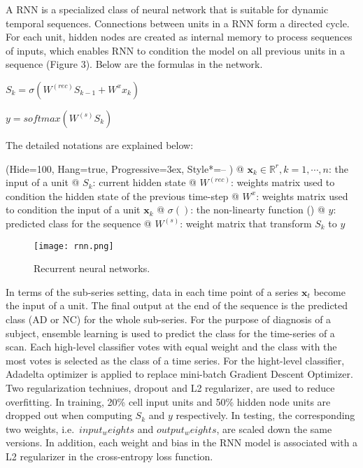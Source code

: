 A RNN is a specialized class of neural network that is suitable for dynamic temporal sequences. Connections between units in a RNN form a directed cycle. For each unit, hidden nodes are created as internal memory to process sequences of inputs, which enables RNN to condition the model on all previous units in a sequence (Figure 3). Below are the formulas in the network.

\begin{center}
$S_k = \sigma(W^{(rec)}S_{k-1} + W^{x}x_k )$
\end{center} 
\begin{center}
$y = softmax(W^{(s)}S_k)$
\end{center}

The detailed notations are explained below:
\begin{easylist}
\ListProperties(Hide=100, Hang=true, Progressive=3ex, Style*=-- )
@ $ \textbf{x}_k \in  \mathbb{R}^{r}, k=1, \cdots , n$: the input of a unit
@ $S_k $: current hidden state
@ $W^{(rec)}$: weights matrix used to condition the hidden state of the previous time-step 
@ $W^{x}$: weights matrix used to condition the input of a unit $ \textbf{x}_k$
@ $\sigma()$: the non-linearty function ()
@ $y$: predicted class for the sequence
@ $W^{(s)}$: weight matrix that transform $S_k$ to $y$
\end{easylist}

\begin{figure}
    \centering
    \texttt{[image: rnn.png]}
    \caption{Recurrent neural networks.}
    \label{fig:awesome_image}
\end{figure}

In terms of the sub-series setting, data in each time point of a series $\textbf{x}_t$ become the input of a unit. The final output at the end of the sequence is the predicted class (AD or NC) for the whole sub-series. For the purpose of diagnosis of a subject, ensemble learning is used to predict the class for the time-series of a scan. Each high-level classifier votes with equal weight and the class with the most votes is selected as the class of a time series. For the hight-level classifier, Adadelta optimizer is applied to replace mini-batch Gradient Descent Optimizer. Two regularization techniues, dropout \cite{srivastava14} and L2 regularizer, are used to reduce overfitting. In training, 20\% cell input units and 50\% hidden node units are dropped out when computing $S_k$ and $y$ respectively. In testing, the corresponding two weights, i.e.\ $input_weights$ and $output_weights$, are scaled down the same versions. In addition, each weight and bias in the RNN model is associated with a L2 regularizer in the cross-entropy loss function. 